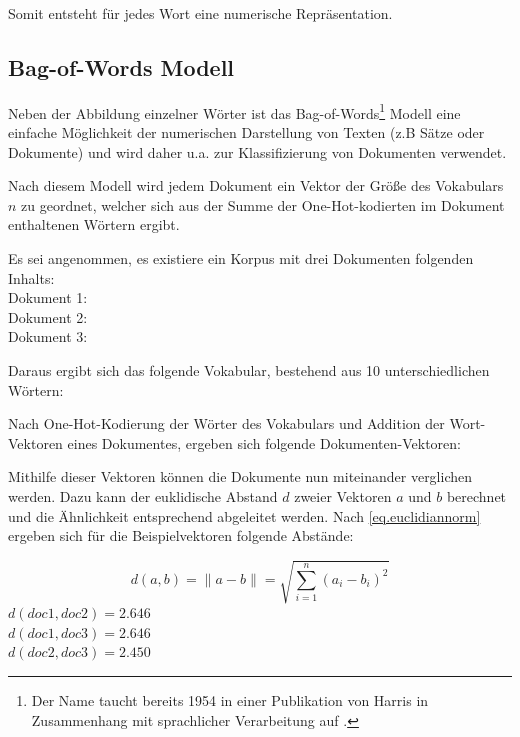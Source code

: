 Somit entsteht für jedes Wort eine numerische Repräsentation.

\subsection{Bag-of-Words Modell}\label{ss.bagofwords}
Neben der Abbildung einzelner Wörter ist das Bag-of-Words\footnote{Der Name  taucht bereits 1954 in einer Publikation von Harris in Zusammenhang mit sprachlicher Verarbeitung auf \citep{Harris1954}.} Modell eine einfache Möglichkeit der numerischen Darstellung von Texten (z.B Sätze oder Dokumente) und wird daher u.a. zur Klassifizierung von Dokumenten verwendet.

Nach diesem Modell wird jedem Dokument ein Vektor der Größe des Vokabulars $n$ zu geordnet, welcher sich aus der Summe der One-Hot-kodierten im Dokument enthaltenen Wörtern ergibt.

Es sei angenommen, es existiere ein Korpus mit drei Dokumenten folgenden Inhalts:\\
Dokument 1: \\
Dokument 2: \\
Dokument 3: 

Daraus ergibt sich das folgende Vokabular, bestehend aus 10 unterschiedlichen Wörtern:


Nach One-Hot-Kodierung der Wörter des Vokabulars und Addition der Wort-Vektoren eines Dokumentes, ergeben sich folgende Dokumenten-Vektoren:


Mithilfe dieser Vektoren können die Dokumente nun miteinander verglichen werden. Dazu kann der euklidische Abstand $d$ zweier Vektoren $a$ und $b$ berechnet und die Ähnlichkeit entsprechend abgeleitet werden. Nach \autoref{eq.euclidiannorm} ergeben sich für die Beispielvektoren folgende Abstände:

\begin{equation}
    d(a, b) = \|a - b\| = \sqrt{\sum^n_{i=1} (a_i-b_i)^2} \label{eq.euclidiannorm}
\end{equation}
$d(doc1, doc2) = 2.646$\\
$d(doc1, doc3) = 2.646$\\
$d(doc2, doc3) = 2.450$

